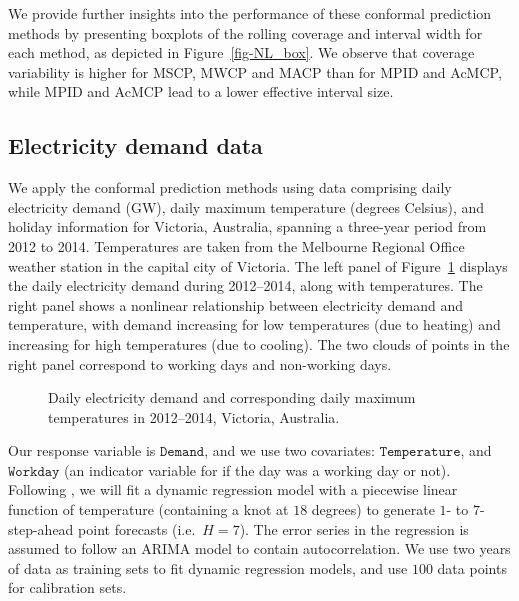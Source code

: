 \documentclass[
  11pt,
  12pt]{article}
\theoremstyle{plain}
\theoremstyle{remark}
\begin{document}
We provide further insights into the performance of these conformal
prediction methods by presenting boxplots of the rolling coverage and
interval width for each method, as depicted in Figure~\ref{fig-NL_box}.
We observe that coverage variability is higher for MSCP, MWCP and MACP
than for MPID and AcMCP, while MPID and AcMCP lead to a lower effective
interval size.

\subsection{Electricity demand data}\label{electricity-demand-data}

We apply the conformal prediction methods using data comprising daily
electricity demand (GW), daily maximum temperature (degrees Celsius),
and holiday information for Victoria, Australia, spanning a three-year
period from 2012 to 2014. Temperatures are taken from the Melbourne
Regional Office weather station in the capital city of Victoria. The
left panel of Figure~\ref{fig-elec_data} displays the daily electricity
demand during 2012--2014, along with temperatures. The right panel shows
a nonlinear relationship between electricity demand and temperature,
with demand increasing for low temperatures (due to heating) and
increasing for high temperatures (due to cooling). The two clouds of
points in the right panel correspond to working days and non-working
days.

\begin{figure}[!hb]


\caption{\label{fig-elec_data}Daily electricity demand and corresponding
daily maximum temperatures in 2012--2014, Victoria, Australia.}

\end{figure}%

Our response variable is \(\texttt{Demand}\), and we use two covariates:
\(\texttt{Temperature}\), and \(\texttt{Workday}\) (an indicator
variable for if the day was a working day or not). Following
\citet{hyndman2021}, we will fit a dynamic regression model with a
piecewise linear function of temperature (containing a knot at \(18\)
degrees) to generate \(1\)- to \(7\)-step-ahead point forecasts
(i.e.~\(H=7\)). The error series in the regression is assumed to follow
an ARIMA model to contain autocorrelation. We use two years of data as
training sets to fit dynamic regression models, and use \(100\) data
points for calibration sets.
\end{document}
